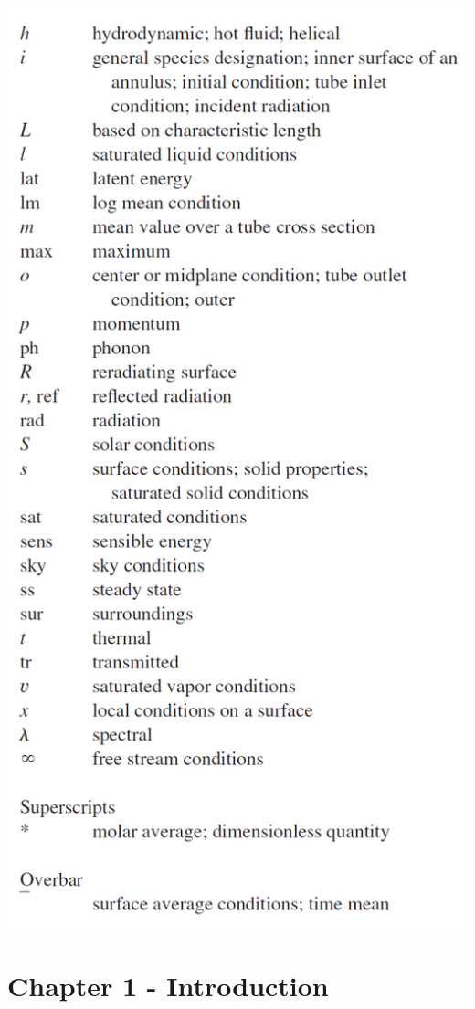 \documentclass[10pt,landscape]{article}
\newenvironment{Figure}
     {\par\medskip\noindent\minipage{\linewidth}}
     {\endminipage\par\medskip}
\begin{document}
\begin{multicols}{3}
\begin{Figure}
    \includegraphics[width=\linewidth]{Symbols_8.png}
\end{Figure}

\section{Chapter 1 - Introduction}

\end{multicols}
\end{document}
